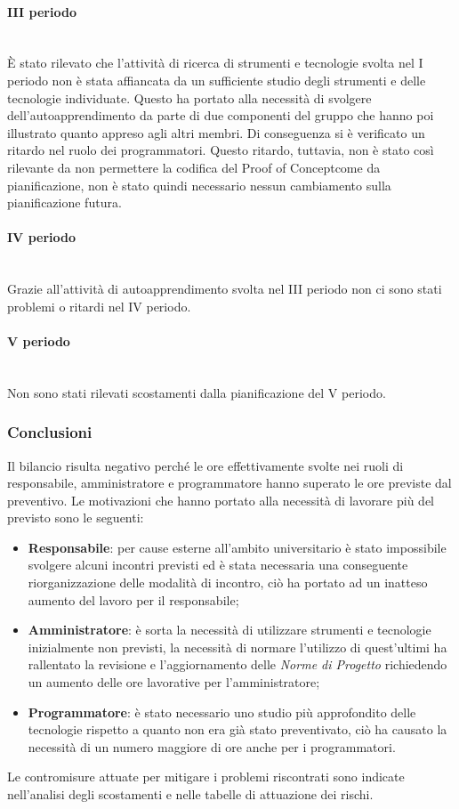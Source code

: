 		\paragraph*{III periodo} \mbox{} \\
		È stato rilevato che l'attività di ricerca di strumenti e tecnologie svolta nel I periodo non è stata affiancata da un sufficiente studio degli strumenti e delle tecnologie individuate. Questo ha portato alla necessità di svolgere dell'autoapprendimento da parte di due componenti del gruppo che hanno poi illustrato quanto appreso agli altri membri. Di conseguenza si è verificato un ritardo nel ruolo dei programmatori. Questo ritardo, tuttavia, non è stato così rilevante da non permettere la codifica del Proof of Concept\glosp come da pianificazione, non è stato quindi necessario nessun cambiamento sulla pianificazione futura. 
		\paragraph*{IV periodo} \mbox{} \\
		Grazie all'attività di autoapprendimento svolta nel III periodo non ci sono stati problemi o ritardi nel IV periodo.
		\paragraph*{V periodo} \mbox{} \\
		Non sono stati rilevati scostamenti dalla pianificazione del V periodo.
		\subsubsection{Conclusioni}
		Il bilancio risulta negativo perché le ore effettivamente svolte nei ruoli di responsabile, amministratore e programmatore hanno superato le ore previste dal preventivo.
		Le motivazioni che hanno portato alla necessità di lavorare più del previsto sono le seguenti:
		\begin{itemize}
			\item \textbf{Responsabile}: per cause esterne all'ambito universitario è stato impossibile svolgere alcuni incontri previsti ed è stata necessaria una conseguente riorganizzazione delle modalità di incontro, ciò ha portato ad un inatteso aumento del lavoro per il responsabile;
			\item \textbf{Amministratore}: è sorta la necessità di utilizzare strumenti e tecnologie inizialmente non previsti, la necessità di normare l'utilizzo di quest'ultimi ha rallentato la revisione e l'aggiornamento delle \textit{Norme di Progetto} richiedendo un aumento delle ore lavorative per l'amministratore;
			\item \textbf{Programmatore}: è stato necessario uno studio più approfondito delle tecnologie rispetto a quanto non era già stato preventivato, ciò ha causato la necessità di un numero maggiore di ore anche per i programmatori.
		\end{itemize}
		Le contromisure attuate per mitigare i problemi riscontrati sono indicate nell'analisi degli scostamenti e nelle tabelle di attuazione dei rischi.
